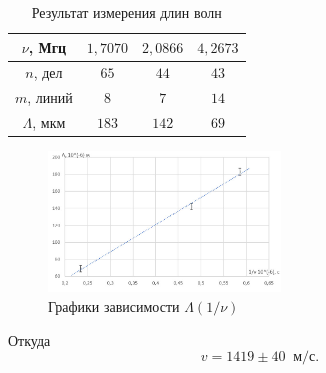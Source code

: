 \documentclass[a4paper]{article}
\begin{document}
\begin{table}[!ht]
    \centering
    \caption{Результат измерения длин волн}
    \begin{tabular}{|c|c|c|c|}
    \hline
    $\nu$, Мгц     & $1,7070$ & $2,0866$ & $4,2673$ \\ \hline
    $n$, дел       & $65$     & $44$     & $43$     \\ \hline
    $m$, линий     & $8$      & $7$      & $14$     \\ \hline
    $\Lambda$, мкм & $183$    & $142$    & $69$     \\ \hline
    \end{tabular}
\end{table}
\begin{figure}[h]
			\begin{center}
				\includegraphics[width = 0.55\textwidth]{images/Im2.jpg}
		        \caption{Графики зависимости $\Lambda(1/\nu)$}
			\end{center}
    \end{figure}


\noindent Откуда $$v = 1419 \pm 40 \;\; \text{м/с}.$$
\end{document}
